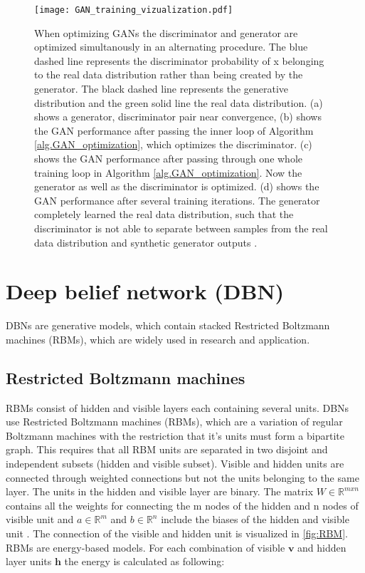 \begin{figure}[p]
  \centering
  \texttt{[image: GAN\_training\_vizualization.pdf]}
  \caption{When optimizing GANs the discriminator and generator are optimized simultanously in an alternating procedure. The blue dashed line represents the discriminator probability of x belonging to the real data distribution rather than being created by the generator. The black dashed line represents the generative distribution and the green solid line the real data distribution. (a) shows a generator, discriminator pair near convergence, (b) shows the GAN performance after passing the inner loop of Algorithm \ref{alg.GAN_optimization}, which optimizes the discriminator. (c) shows the GAN performance after passing through one whole training loop in Algorithm \ref{alg.GAN_optimization}. Now the generator as well as the discriminator is optimized. (d) shows the GAN performance after several training iterations. The generator completely learned the real data distribution, such that the discriminator is not able to separate between samples from the real data distribution and synthetic generator outputs \cite{Goodfellow2014}.}
  \label{fig:GAN_training_vizualization}
\end{figure}

\section{Deep belief network (DBN)}

DBNs are generative models, which contain stacked Restricted Boltzmann machines (RBMs), which are widely used in research and application.

\subsection{Restricted Boltzmann machines}
RBMs consist of hidden and visible layers each containing several units. DBNs use Restricted Boltzmann machines (RBMs), which are a variation of regular Boltzmann machines with the restriction that it's units must form a bipartite graph. This requires that all RBM units are separated in two disjoint and independent subsets (hidden and visible subset). Visible and hidden units are connected through weighted connections but not the units belonging to the same layer. The units in the hidden and visible layer are binary. The matrix $W \in \mathbb{R}^{mxn}$ contains all the weights for connecting the m nodes of the hidden and n nodes of visible unit and $a \in \mathbb{R}^{m}$ and $b \in \mathbb{R}^{n}$ include the biases of the hidden and visible unit \cite{Hinton2010}. The connection of the visible and hidden unit is visualized in \ref{fig:RBM}. RBMs are energy-based models. For each combination of visible $\mathbf{v}$ and hidden layer units $\mathbf{h}$ the energy is calculated as following:

